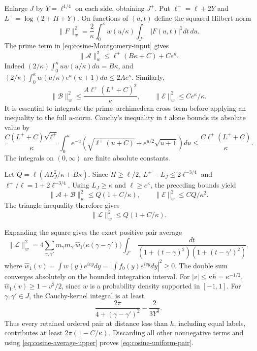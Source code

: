 Enlarge \(J\) by \(Y=\ell^{1/4}\) on each side, obtaining
\(J^+\). Put \(\ell^+=\ell+2Y\) and
\(L^+=\log(2+H+Y)\). On functions of \((u,t)\) define the
squared Hilbert norm
\[
 \|F\|_w^2=\frac2\kappa\int_0^\kappa w(u/\kappa)
                       \int_{J^+}|F(u,t)|^2dt\,du.
\]
The prime term in \eqref{eq:cosine-Montgomery-input} gives
\[
 \|\mathcal A\|_w^2
       \le \ell^+(B\kappa+C)+Ce^\kappa.
\]
Indeed \((2/\kappa)\int_0^\kappa u w(u/\kappa)du=B\kappa\),
and
\((2/\kappa)\int_0^\kappa w(u/\kappa)e^u(u+1)du
 \le 2Ae^\kappa\).
Similarly,
\[
 \|\mathcal B\|_w^2
       \le\frac{A\ell^+(L^++C)^2}{\kappa},
 \qquad
 \|\mathcal E\|_w^2\le Ce^\kappa/\kappa.
\]
It is essential to integrate the prime--archimedean cross term
before applying an inequality to the full \(u\)-norm. Cauchy's
inequality in \(t\) alone bounds its absolute value by
\[
 \frac{C(L^++C)\sqrt{\ell^+}}{\kappa}
 \int_0^\kappa e^{-u}
   \left(\sqrt{\ell^+(u+C)}+e^{u/2}\sqrt{u+1}\right)du
 \le\frac{C\ell^+(L^++C)}{\kappa}.
\]
The integrals on \((0,\infty)\) are finite absolute constants.

Let
\(Q=\ell(A L_J^2/\kappa+B\kappa)\).
Since \(H\ge\ell/2\),
\(L^+-L_J\le2\ell^{-3/4}\) and
\(\ell^+/\ell=1+2\ell^{-3/4}\).
Using \(L_J\ge\kappa\) and \(\ell\ge e^\kappa\), the preceding
bounds yield
\[
 \|\mathcal A+\mathcal B\|_w^2
       \le Q(1+C/\kappa),\qquad
 \|\mathcal E\|_w^2\le CQ/\kappa^2.
\]
The triangle inequality therefore gives
\begin{equation}\label{eq:cosine-average-upper}
 \|\mathcal L\|_w^2\le Q(1+C/\kappa).
\end{equation}

Expanding the square gives the exact positive pair average
\[
 \|\mathcal L\|_w^2
 =4\sum_{\gamma,\gamma'}m_\gamma m_{\gamma'}
 \widehat w_1\bigl(\kappa(\gamma-\gamma')\bigr)
 \int_{J^+}\frac{dt}
 {(1+(t-\gamma)^2)(1+(t-\gamma')^2)},
\]
where \(\widehat w_1(v)=\int w(y)e^{ivy}dy
=|\int f_0(y)e^{ivy}dy|^2\ge0\).
The double sum converges absolutely on the bounded integration
interval. For \(|v|\le\kappa h=\kappa^{-1/2}\),
\(\widehat w_1(v)\ge1-v^2/2\), since \(w\) is a probability
density supported in \([-1,1]\). For \(\gamma,\gamma'\in J\),
the Cauchy-kernel integral is at least
\[
 \frac{2\pi}{4+(\gamma-\gamma')^2}-\frac{2}{3Y^3}.
\]
Thus every retained ordered pair at distance less than \(h\),
including equal labels, contributes at least
\(2\pi(1-C/\kappa)\). Discarding all other nonnegative terms
and using \eqref{eq:cosine-average-upper} proves
\eqref{eq:cosine-uniform-pair}.

